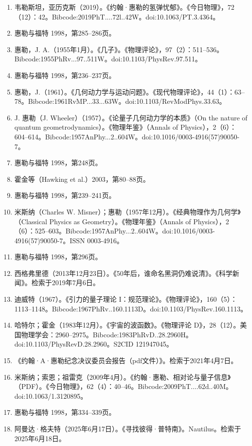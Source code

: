 \begin{enumerate}
\item 韦勒斯坦，亚历克斯（2019）。《约翰·惠勒的氢弹忧郁》。《今日物理》，72（12）：42。Bibcode:2019PhT....72l..42W。doi:10.1063/PT.3.4364。
\item 惠勒与福特 1998，第285–286页。
\item 惠勒，J. A.（1955年1月）。《几子》。《物理评论》，97（2）：511–536。Bibcode:1955PhRv...97..511W。doi:10.1103/PhysRev.97.511。
\item 惠勒与福特 1998，第236–237页。
\item 惠勒，J.（1961）。《几何动力学与运动问题》。《现代物理评论》，44（1）：63–78。Bibcode:1961RvMP...33...63W。doi:10.1103/RevModPhys.33.63。
\item J. 惠勒（J. Wheeler）（1957）。《论量子几何动力学的本质》（On the nature of quantum geometrodynamics）。《物理年鉴》（Annals of Physics），2（6）：604–614。Bibcode:1957AnPhy...2..604W。doi:10.1016/0003-4916(57)90050-7。
\item 惠勒与福特 1998，第248页。
\item 霍金等（Hawking et al.）2003，第80–88页。
\item 惠勒与福特 1998，第239–241页。
\item 米斯纳（Charles W. Misner）；惠勒（1957年12月）。《经典物理作为几何学》（Classical Physics as Geometry）。《物理年鉴》（Annals of Physics），2（6）：525–603。Bibcode:1957AnPhy...2..604W。doi:10.1016/0003-4916(57)90050-7。ISSN 0003-4916。
\item 惠勒与福特 1998，第296页。
\item 西格弗里德（2013年12月23日）。《50年后，谁命名黑洞仍难说清》。《科学新闻》。检索于2019年7月6日。
\item 迪威特（1967）。《引力的量子理论 I：规范理论》。《物理评论》，160（5）：1113–1148。Bibcode:1967PhRv..160.1113D。doi:10.1103/PhysRev.160.1113。
\item 哈特尔；霍金（1983年12月）。《宇宙的波函数》。《物理评论 D》，28（12）。美国物理学会：2960–2975。Bibcode:1983PhRvD..28.2960H。doi:10.1103/PhysRevD.28.2960。S2CID 121947045。
\item 《约翰·A·惠勒纪念决议委员会报告（pdf文件）》。检索于2021年4月7日。
\item 米斯纳；索恩；祖雷克（2009年4月）。《约翰·惠勒、相对论与量子信息》（PDF）。《今日物理》，62（4）：40–46。Bibcode:2009PhT....62d..40M。doi:10.1063/1.3120895。
\item 惠勒与福特 1998，第334–339页。
\item 阿曼达·格夫特（2025年6月17日）。《寻找彼得·普特南》。Nautilus。检索于2025年6月18日。

\end{enumerate}
